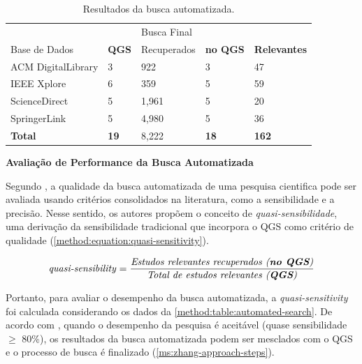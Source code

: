 \begin{table}[htbp]
\centering
\caption{Resultados da busca automatizada.}
\label{method:table:automated-search}
\begin{tabular}{lllll}
\hline
 &  & Busca Final &                 &                   \\ \cline{3-5} 
Base de Dados & \textbf{QGS} & Recuperados    & \textbf{no QGS} & \textbf{Relevantes} \\ \hline
ACM DigitalLibrary & 3            & 922          & 3               & 47                \\
IEEE Xplore        & 6            & 359          & 5               & 59                \\
ScienceDirect      & 5            & 1,961        & 5               & 20                \\
SpringerLink       & 5            & 4,980        & 5               & 36                \\
\textbf{Total}   & \textbf{19}  & 8,222        & \textbf{18}     & \textbf{162}      \\ \hline
\end{tabular}
\fautor
\end{table}

\noindent
\textbf{Avaliação de Performance da Busca Automatizada}

Segundo , a qualidade da busca automatizada de uma pesquisa cientifica pode ser avaliada usando critérios consolidados na literatura, como a sensibilidade e a precisão. Nesse sentido, os autores propõem o conceito de \textit{quasi-sensibilidade}, uma derivação da sensibilidade tradicional que incorpora o QGS como critério de qualidade (\autoref{method:equation:quasi-sensitivity}).

\begin{equation}
\label{method:equation:quasi-sensitivity}
\text{\textit{quasi-sensibility}} = \frac{\text{\textit{Estudos relevantes recuperados (\textbf{no QGS})}}}{\text{\textit{Total de estudos relevantes (\textbf{QGS})}}}
\end{equation}

Portanto, para avaliar o desempenho da busca automatizada, a \textit{quasi-sensitivity} foi calculada considerando os dados da \autoref{method:table:automated-search}. De acordo com , quando o desempenho da pesquisa é aceitável (quase sensibilidade $\geq$ 80\%), os resultados da busca automatizada podem ser mesclados com o QGS e o processo de busca é finalizado (\autoref{ms:zhang-approach-steps}).


